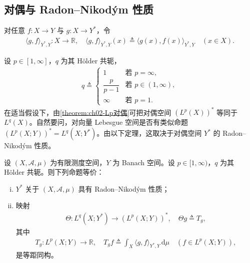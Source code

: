 \documentclass[../../main.tex]{subfiles}%
\begin{document}
\subsection{对偶与 Radon--Nikodým 性质}\label{subsection:ch04-对偶RNP}

对任意 $f:X\to Y$ 与 $g:X\to Y^*$，令
\begin{align*}
\langle g,f\rangle_{Y^*,Y}:X\to\mathbb{R},\quad \langle g,f\rangle_{Y^*,Y}(x)\triangleq \langle g(x),f(x)\rangle_{Y^*,Y}\quad(x\in X).
\end{align*}

设 $p\in[1,\infty]$，$q$ 为其 Hölder 共轭，
\begin{align}
q\triangleq
\begin{cases}
1 & \text{若 }p=\infty,\\
\dfrac{p}{p-1} & \text{若 }p\in(1,\infty),\\
\infty & \text{若 }p=1.
\end{cases} 
\label{align:ch04-4.89}
\end{align}
在适当假设下，由\cref{theorem:ch02-Lp对偶}可把对偶空间 $(L^p(X))^*$ 等同于 $L^q(X)$。自然要问，对向量 Lebesgue 空间是否有类似命题 $(L^p(X;Y))^*=L^q(X;Y^*)$。由以下定理，这取决于对偶空间 $Y^*$ 的 Radon--Nikodým 性质。

\begin{theorem}\label{theorem:ch04-Lp对偶刻画}
设 $(X,\mathcal{A},\mu)$ 为有限测度空间，$Y$ 为 Banach 空间。设 $p\in[1,\infty)$，$q$ 为其 Hölder 共轭。则下列命题等价：
\begin{enumerate}[(i)]
\item\label{item:ch04-Lp对偶刻画-i} $Y^*$ 关于 $(X,\mathcal{A},\mu)$ 具有 Radon--Nikodým 性质；
\item\label{item:ch04-Lp对偶刻画-ii} 映射
\begin{align}
\Theta:L^q(X;Y^*)\to(L^p(X;Y))^*,\quad \Theta g\triangleq T_g, \label{align:ch04-4.90a}
\end{align}
其中
\begin{align}
T_g:L^p(X;Y)\to\mathbb{R},\quad T_gf\triangleq \int_X\langle g,f\rangle_{Y^*,Y}\,\mathrm{d}\mu\quad(f\in L^p(X;Y)), \label{align:ch04-4.90b}
\end{align}
是等距同构。
\end{enumerate}
\end{theorem}
\end{document}
